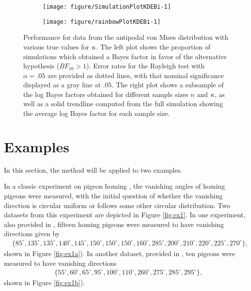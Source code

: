 \begin{figure}
  \begin{subfigure}[t]{0.5\linewidth}\centering
\begin{knitrout}
\color{fgcolor}
\texttt{[image: figure/SimulationPlotKDEBi-1]} 

\end{knitrout}
    \caption{}\label{fig:simKDEBierror}
  \end{subfigure}%
  \begin{subfigure}[t]{0.5\linewidth}\centering
\begin{knitrout}
\color{fgcolor}
\texttt{[image: figure/rainbowPlotKDEBi-1]} 

\end{knitrout}
    \caption{}\label{fig:simKDEBibfs}
  \end{subfigure}
  \caption{Performance for data from the antipodal von Mises distribution with various true values for \( \kappa \). The left plot shows the proportion of simulations which obtained a Bayes factor in favor of the alternative hypothesis (\(BF_{10} > 1\)). Error rates for the Rayleigh test with \(\alpha = .05\) are provided as dotted lines, with that nominal significance displayed as a gray line at \(.05\). The right plot shows a subsample of the log Bayes factors obtained for different sample sizes \(n\) and \(\kappa\), as well as a solid trendline computed from the full simulation showing the average log Bayes factor for each sample size.}\label{fig:simKDEBi}
\end{figure}



\section{Examples} \label{sec:ex}
In this section, the method will be applied to two examples. 




In a classic experiment on pigeon homing \citep{schmidt1963role}, the vanishing angles of homing pigeons were measured, with the initial question of whether the vanishing direction is circular uniform or follows some other circular distribution. Two datasets from this experiment are depicted in Figure \ref{fig:ex1}. In one experiment, also provided in \citet{fisher1995statistical}, fifteen homing pigeons were measured to have vanishing directions given by 
\begin{align}
&\{ 85^\circ, 135^\circ, 135^\circ, 140^\circ, 145^\circ, 150^\circ, 150^\circ, 150^\circ, 160^\circ, 285^\circ, 200^\circ, 210^\circ, 220^\circ, 225^\circ, 270^\circ \},
\end{align} 
shown in  Figure \ref{fig:ex1a}). In another dataset, provided in \citet{mardia2009directional}, ten pigeons were measured to have vanishing directions 
\begin{align}
&\{ 55^\circ, 60^\circ, 65^\circ, 95^\circ, 100^\circ, 110^\circ, 260^\circ, 275^\circ, 285^\circ, 295^\circ\},
\end{align} 
 shown in Figure \ref{fig:ex1b}).

